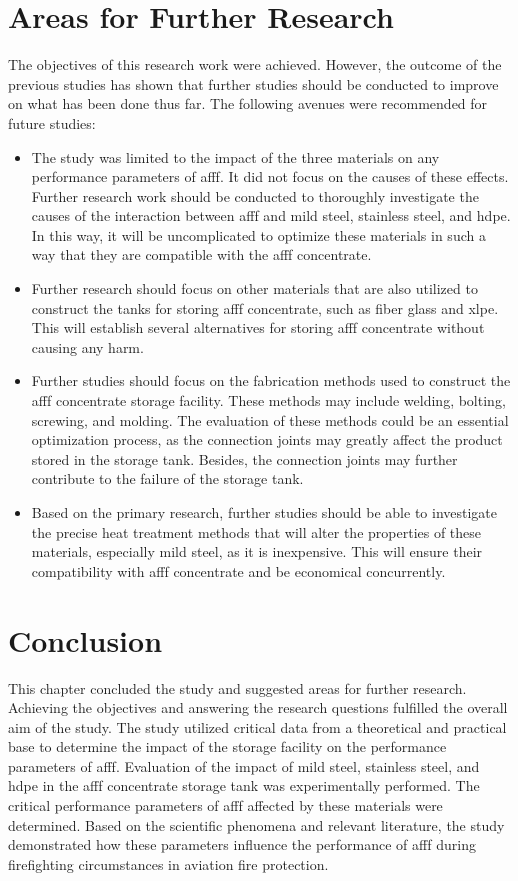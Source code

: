 \section{Areas for Further Research}
The objectives of this research work were achieved. However, the outcome of the previous studies has shown that further studies should be conducted to improve on what has been done thus far. The following avenues were recommended for future studies:

\begin{itemize}
    \item The study was limited to the impact of the three materials on any performance parameters of \acrshort{afff}. It did not focus on the causes of these effects. Further research work should be conducted to thoroughly investigate the causes of the interaction between \acrshort{afff} and mild steel, stainless steel, and \acrshort{hdpe}. In this way, it will be uncomplicated to optimize these materials in such a way that they are compatible with the \acrshort{afff} concentrate.
    \item Further research should focus on other materials that are also utilized to construct the tanks for storing \acrshort{afff} concentrate, such as fiber glass and \acrfull{xlpe}. This will establish several alternatives for storing \acrshort{afff} concentrate without causing any harm. 
    \item Further studies should focus on the fabrication methods used to construct the \acrshort{afff} concentrate storage facility. These methods may include welding, bolting, screwing, and molding. The evaluation of these methods could be an essential optimization process, as the connection joints may greatly affect the product stored in the storage tank. Besides, the connection joints may further contribute to the failure of the storage tank. 
    \item Based on the primary research, further studies should be able to investigate the precise heat treatment methods that will alter the properties of these materials, especially mild steel, as it is inexpensive. This will ensure their compatibility with \acrshort{afff} concentrate and be economical concurrently.   
\end{itemize}

\section{Conclusion}
This chapter concluded the study and suggested areas for further research. Achieving the objectives and answering the research questions fulfilled the overall aim of the study. The study utilized critical data from a theoretical and practical base to determine the impact of the storage facility on the performance parameters of \acrshort{afff}. Evaluation of the impact of mild steel, stainless steel, and \acrshort{hdpe} in the \acrshort{afff} concentrate storage tank was experimentally performed. The critical performance parameters of \acrshort{afff} affected by these materials were determined. Based on the scientific phenomena and relevant literature, the study demonstrated how these parameters influence the performance of \acrshort{afff} during firefighting circumstances in aviation fire protection.